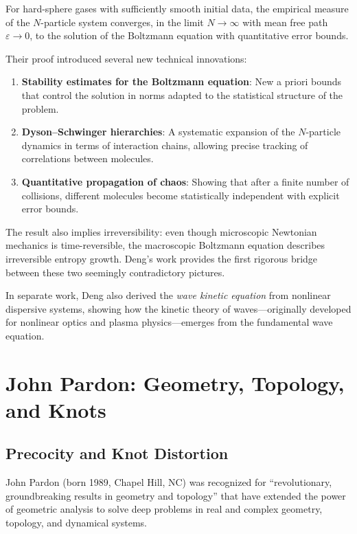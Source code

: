 \begin{theorem}
For hard-sphere gases with sufficiently smooth initial data, the empirical measure of the $N$-particle system converges, in the limit $N \to \infty$ with mean free path $\varepsilon \to 0$, to the solution of the Boltzmann equation with quantitative error bounds.
\end{theorem}

Their proof introduced several new technical innovations:
\begin{enumerate}
\item \textbf{Stability estimates for the Boltzmann equation}: New a priori bounds that control the solution in norms adapted to the statistical structure of the problem.
\item \textbf{Dyson--Schwinger hierarchies}: A systematic expansion of the $N$-particle dynamics in terms of interaction chains, allowing precise tracking of correlations between molecules.
\item \textbf{Quantitative propagation of chaos}: Showing that after a finite number of collisions, different molecules become statistically independent with explicit error bounds.
\end{enumerate}

\begin{highlightbox}
The result also implies irreversibility: even though microscopic Newtonian mechanics is time-reversible, the macroscopic Boltzmann equation describes irreversible entropy growth. Deng's work provides the first rigorous bridge between these two seemingly contradictory pictures.
\end{highlightbox}

In separate work, Deng also derived the \emph{wave kinetic equation} from nonlinear dispersive systems, showing how the kinetic theory of waves---originally developed for nonlinear optics and plasma physics---emerges from the fundamental wave equation.

\section{John Pardon: Geometry, Topology, and Knots}

\subsection{Precocity and Knot Distortion}
John Pardon (born 1989, Chapel Hill, NC) was recognized for ``revolutionary, groundbreaking results in geometry and topology'' that have extended the power of geometric analysis to solve deep problems in real and complex geometry, topology, and dynamical systems.

